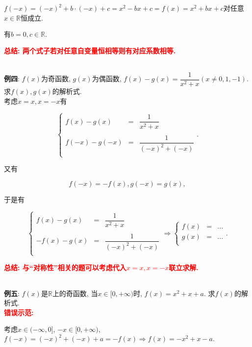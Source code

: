 \documentclass[8pt]{article}
\begin{document}
					$f(-x)=(-x)^2+b\cdot(-x)+c=x^2-bx+c=f(x)=x^2+bx+c$对任意$x\in\mathbb{R}$恒成立.

					有$b=0, c\in\mathbb{R}$.

					\textbf{\textcolor{red}{总结: 两个式子若对任意自变量恒相等则有对应系数相等.}}

				~\\

				\textbf{例四}: $f(x)$为奇函数, $g(x)$为偶函数, $f(x)-g(x)=\dfrac{1}{x^2+x} (x\neq 0, 1, -1)$. 求$f(x), g(x)$的解析式.
					~\\

					考虑$x=x, x=-x$有

					$$
					\left\{
					\begin{array}{rcl}
						f(x) - g(x) &=& \dfrac{1}{x^2+x}\\\\
						f(-x) - g(-x) &=& \dfrac{1}{(-x)^2+(-x)}\\
					\end{array}
					\right..
					$$

					又有

					$$f(-x) = -f(x), g(-x) = g(x),$$

					于是有

					$$
					\left\{
					\begin{array}{rcl}
						f(x) - g(x) &=& \dfrac{1}{x^2+x}\\\\
						-f(x) - g(x) &=& \dfrac{1}{(-x)^2+(-x)}\\
					\end{array}
					\right.
					\Rightarrow
					\left\{
					\begin{array}{rcl}
						f(x) &=& ...\\
						g(x) &=& ...\\
					\end{array}
					\right..
					$$

					\textbf{\textcolor{red}{总结: 与“对称性”相关的题可以考虑代入$x=x, x=-x$联立求解.}}

				~\\

				\textbf{例五}: $f(x)$是$\mathbb{R}$上的奇函数, 当$x\in [0, +\infty)$时, $f(x)=x^2+x+a$. 求$f(x)$的解析式.
					~\\

					\textbf{\textcolor{red}{错误示范:}}

					考虑$x\in(-\infty, 0]$, $-x \in [0, +\infty)$, $f(-x)=(-x)^2+(-x)+a=-f(x) \Rightarrow f(x)=-x^2+x-a$.
\end{document}
